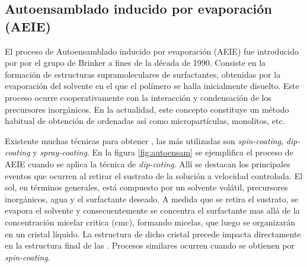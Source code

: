 	
	

	\subsection{Autoensamblado inducido por evaporación (AEIE)}

	El proceso de Autoensamblado inducido por evaporación (AEIE) fue introducido por por el grupo de Brinker a fines de la década de 1990.\cite{Lu1997,Brinker1999} Consiste en la formación de estructuras supramoleculares de surfactantes, obtenidas por la evaporación del solvente en el que el polímero se halla inicialmente disuelto. Este proceso ocurre cooperativamente con la interacción y condensación de los precursores inorgánicos. En la actualidad, este concepto constituye un método habitual de obtención de \pdm\space ordenadas\cite{Grosso2004} así como micropartículas, monolitos, etc.\cite{Yang1998a}

	Existente muchas técnicas para obtener \pdm\space, las más utilizadas son \textit{spin-coating}, \textit{dip-coating} y \textit{spray-coating}. En la figura \ref{fig:autoensam} se ejemplifica el proceso de AEIE cuando se aplica la técnica de \textit{dip-coting}. Allí se destacan los principales eventos que ocurren al retirar el sustrato de la solución a velocidad controlada. El sol, en términos generales, está compuesto por un solvente volátil, precursores inorgánicos, agua y el surfactante deseado. A medida que se retira el sustrato, se evapora el solvente y consecuentemente se concentra el surfactante mas allá de la concentración micelar critica (cmc), formando micelas, que luego se organizarán en un cristal líquido. La estructura de dicho cristal precede impacta directamente en la estructura final de las \pdm. Procesos similares ocurren cuando se obtienen \pdm\space por \textit{spin-coating}. 
 			
